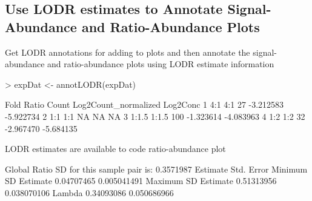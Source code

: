 \documentclass{article}
\begin{document}
\subsection{Use LODR estimates to Annotate Signal-Abundance and Ratio-Abundance Plots}
Get LODR annotations for adding to plots and then annotate the signal-abundance
and ratio-abundance plots using LODR estimate information 

\begin{Schunk}
\begin{Sinput}
> expDat <- annotLODR(expDat)
\end{Sinput}
\begin{Soutput}
   Fold Ratio Count Log2Count_normalized  Log2Conc
1   4:1   4:1    27            -3.212583 -5.922734
2   1:1   1:1    NA                   NA        NA
3 1:1.5 1:1.5   100            -1.323614 -4.083963
4   1:2   1:2    32            -2.967470 -5.684135

LODR estimates are available to code ratio-abundance plot

Global Ratio SD for this sample pair is: 0.3571987 
                      Estimate  Std. Error
Minimum SD Estimate 0.04707465 0.005041491
Maximum SD Estimate 0.51313956 0.038070106
Lambda              0.34093086 0.050686966
\end{Soutput}
\end{Schunk}
\clearpage
\end{document}
